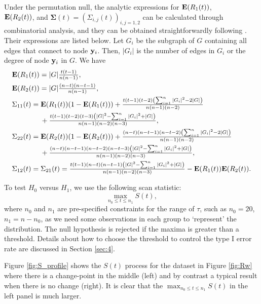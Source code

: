 \documentclass[arxiv, preprint]{imsart}
\numberwithin{equation}{section}
\theoremstyle{plain}
\begin{document}
Under the permutation null, the analytic expressions for $\mathbf{E}(R_1(t))$, \\ $\mathbf{E}(R_2(t))$, and $\mathbf{\Sigma}(t) = (\Sigma_{i,j}(t))_{i,j=1,2}$ can be calculated through combinatorial analysis, and they can be obtained straightforwardly following \cite{chen2017new}. Their expressions are listed below. Let $G_i$ be the subgraph of $G$ containing all edges that connect to node ${\bf y}_i$. Then, $|G_i|$ is the number of edges in $G_i$ or the degree of node ${\bf y}_i$ in $G$. We have
\begin{align*}
\label{eq:summary_S}
&\mathbf{E}(R_1(t))  = |G| \tfrac{t (t-1)}{n (n-1)},\\ 
&\mathbf{E}(R_2(t))  = |G| \tfrac{(n-t)(n-t-1)}{n (n-1)},\\
&\Sigma_{11}(t)  =  \mathbf{E}(R_1(t))(1-\mathbf{E}(R_1(t))) +  \tfrac{t(t-1)(t-2)\left(\sum_{i=1}^n |G_i|^2 - 2|G|\right)}{n (n-1)(n-2)}  \\
& \quad \quad \quad \quad + \tfrac{t(t-1)(t-2)(t-3) \left(|G|^2 - \sum_{i=1}^n |G_i|^2  + |G|\right)}{n(n-1)(n-2)(n-3)}, \\
& \Sigma_{22}(t)  =  \mathbf{E}(R_2(t))(1-\mathbf{E}(R_2(t))) +  \tfrac{(n-t)(n-t-1)(n-t-2)\left(\sum_{i=1}^n |G_i|^2 - 2|G|\right)}{n (n-1)(n-2)} \\
& \quad \quad \quad \quad +  \tfrac{(n-t)(n-t-1)(n-t-2)(n-t-3)\left(|G|^2 - \sum_{i=1}^n |G_i|^2  + |G|\right)}{n (n-1)(n-2)(n-3)},\\
&\Sigma_{12}(t)  = \Sigma_{21}(t) =  \tfrac{t (t-1)(n-t)(n-t-1)\left(|G|^2 - \sum_{i=1}^n |G_i|^2  + |G|\right)}{n (n-1)(n-2)(n-3)} - \mathbf{E}(R_1(t))\mathbf{E}(R_2(t)).
\end{align*}

To test $H_0$ versus $H_1$, we use the following scan statistic:
\begin{equation} \max_{n_0 \le t \le n_1} S(t), \end{equation}
where $n_0$ and $n_1$ are pre-specified constraints for the range of $\tau$, such as $n_0 = 20$, $n_1 = n - n_0$, as we need some observations in each group to `represent' the distribution. The null hypothesis is rejected if the maxima is greater than a threshold. Details about how to choose the threshold to control the type I error rate are discussed in Section \ref{sec:4}.

Figure \ref{fig:S_profile} shows the $S(t)$ process for the dataset in Figure \ref{fig:Rw} where there is a change-point in the middle (left) and by contrast a typical result when there is no change (right). It is clear that the $\max_{n_0 \le t \le n_1} S(t)$ in the left panel is much larger. 
\end{document}
